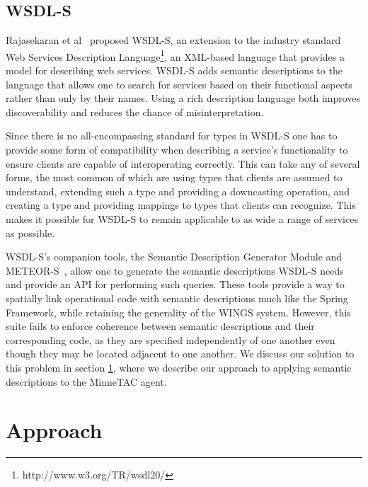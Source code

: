 \documentclass{article}
\begin{document}
\subsection{WSDL-S}

Rajasekaran et al~\cite{rajasekaran2005enhancing} proposed WSDL-S, an extension to the industry standard Web Services Description Language\footnote{http://www.w3.org/TR/wsdl20/}, an XML-based language that provides a model for describing web services.
WSDL-S adds semantic descriptions to the language that allows one to search for services based on their functional aspects rather than only by their names.
Using a rich description language both improves discoverability and reduces the chance of misinterpretation.

Since there is no all-encompassing standard for types in WSDL-S one has to provide some form of compatibility when describing a service's functionality to ensure clients are capable of interoperating correctly.
This can take any of several forms, the most common of which are using types that clients are assumed to understand, extending such a type and providing a downcasting operation, and creating a type and providing mappings to types that clients can recognize.
This makes it possible for WSDL-S to remain applicable to as wide a range of services as possible.

WSDL-S's companion tools, the Semantic Description Generator Module and METEOR-S~\cite{rajasekaran2005enhancing}, allow one to generate the semantic descriptions WSDL-S needs and provide an API for performing such queries.
These tools provide a way to spatially link operational code with semantic descriptions much like the Spring Framework, while retaining the generality of the WINGS system.
However, this suite fails to enforce coherence between semantic descriptions and their corresponding code, as they are specified independently of one another even though they may be located adjacent to one another.
We discuss our solution to this problem in section \ref{sec:approach}, where we describe our approach to applying semantic descriptions to the MinneTAC agent.

\section{Approach}
\label{sec:approach}
\end{document}
